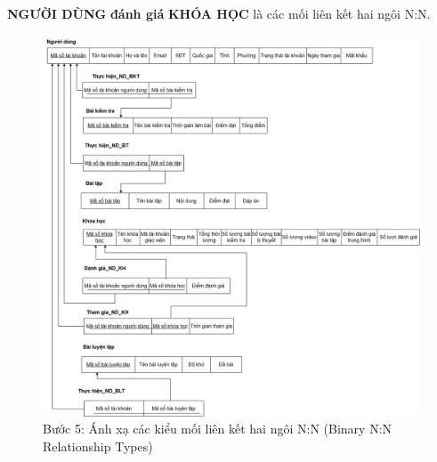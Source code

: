\textbf{NGƯỜI DÙNG} \textbf{đánh giá} \textbf{KHÓA HỌC} là các mối liên kết hai ngôi N:N.
\begin{figure}[H]
    \centering
    \includegraphics[width=1\linewidth]{picture/lkn-n.png}
    \caption{Bước 5: Ánh xạ các kiểu mối liên kết hai ngôi N:N (Binary	N:N	Relationship Types)}
    \label{fig:placeholder}
\end{figure}
\vspace{-40pt}
